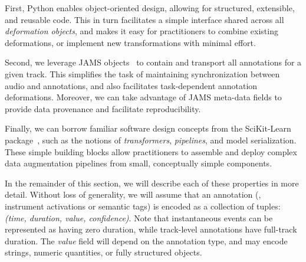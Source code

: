 \documentclass{article}
\begin{document}
%   
First, Python enables object-oriented design, allowing for structured,
extensible, and reusable code.  This in turn facilitates a simple interface shared across
all \emph{deformation objects}, and makes it easy for practitioners to combine existing
deformations, or implement new transformations with minimal effort.

%

Second, we leverage JAMS objects~\cite{humphreyjams} to contain and transport all
annotations for a given track.
This simplifies the task of maintaining synchronization between audio and annotations,
and also facilitates task-dependent annotation deformations.  Moreover, we can take
advantage of JAMS meta-data fields to provide data provenance and facilitate
reproducibility.

%
Finally, we can borrow familiar software design concepts from the SciKit-Learn
package~\cite{scikit-learn}, such as the notions of \emph{transformers},
\emph{pipelines}, and model serialization.  These simple building blocks allow
practitioners to assemble and deploy complex data augmentation pipelines from small,
conceptually simple components.


In the remainder of this section, we will describe each of these
properties in more detail.  Without loss of generality, we will assume that an
annotation (\eg, instrument activations or semantic tags) is encoded as a collection of
tuples: \emph{(time, duration, value, confidence)}.  
Note that instantaneous events can be represented as having zero duration, while
track-level annotations have full-track duration.  The \emph{value} field will depend on
the annotation type, and may encode strings, numeric quantities, or fully structured
objects.
\end{document}
